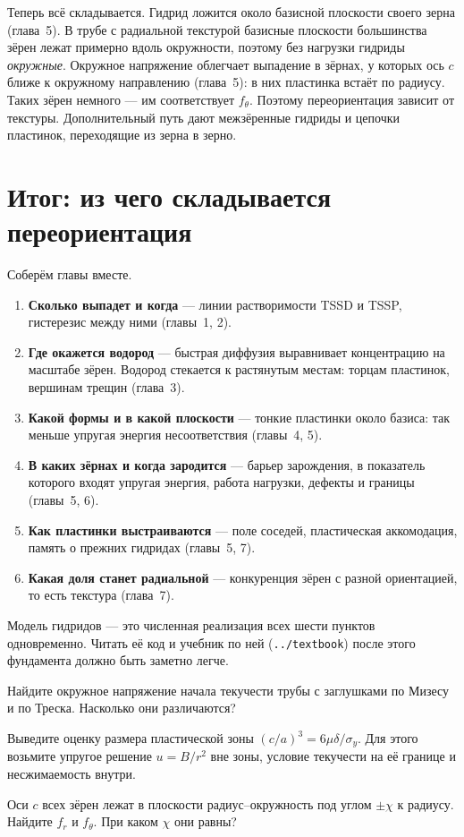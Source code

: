 \begin{zrbox}
Теперь всё складывается. Гидрид ложится около базисной плоскости своего зерна (глава~5). В трубе с радиальной
текстурой базисные плоскости большинства зёрен лежат примерно вдоль окружности, поэтому без нагрузки гидриды
\emph{окружные}. Окружное напряжение облегчает выпадение в зёрнах, у которых ось $c$ ближе к окружному
направлению (глава~5): в них пластинка встаёт по радиусу. Таких зёрен немного --- им соответствует $f_\theta$.
Поэтому переориентация зависит от текстуры. Дополнительный путь дают межзёренные гидриды и цепочки
пластинок, переходящие из зерна в зерно.
\end{zrbox}

\section{Итог: из чего складывается переориентация}

Соберём главы вместе.
\begin{enumerate}
\item \textbf{Сколько выпадет и когда} --- линии растворимости TSSD и TSSP, гистерезис между ними (главы~1, 2).
\item \textbf{Где окажется водород} --- быстрая диффузия выравнивает концентрацию на масштабе зёрен. Водород
  стекается к растянутым местам: торцам пластинок, вершинам трещин (глава~3).
\item \textbf{Какой формы и в какой плоскости} --- тонкие пластинки около базиса: так меньше упругая энергия
  несоответствия (главы~4, 5).
\item \textbf{В каких зёрнах и когда зародится} --- барьер зарождения, в показатель которого входят упругая
  энергия, работа нагрузки, дефекты и границы (главы~5, 6).
\item \textbf{Как пластинки выстраиваются} --- поле соседей, пластическая аккомодация, память о прежних гидридах
  (главы~5, 7).
\item \textbf{Какая доля станет радиальной} --- конкуренция зёрен с разной ориентацией, то есть текстура (глава~7).
\end{enumerate}
Модель гидридов --- это численная реализация всех шести пунктов одновременно. Читать её код и учебник по ней
(\texttt{../textbook}) после этого фундамента должно быть заметно легче.

\begin{exercise}
Найдите окружное напряжение начала текучести трубы с заглушками по Мизесу и по Треска. Насколько они различаются?
\end{exercise}

\begin{exercise}
Выведите оценку размера пластической зоны $(c/a)^3 = 6\mu\delta/\sigma_y$. Для этого возьмите упругое решение
$u = B/r^2$ вне зоны, условие текучести на её границе и несжимаемость внутри.
\end{exercise}

\begin{exercise}
Оси $c$ всех зёрен лежат в плоскости радиус--окружность под углом $\pm\chi$ к радиусу. Найдите $f_r$ и $f_\theta$.
При каком $\chi$ они равны?
\end{exercise}
